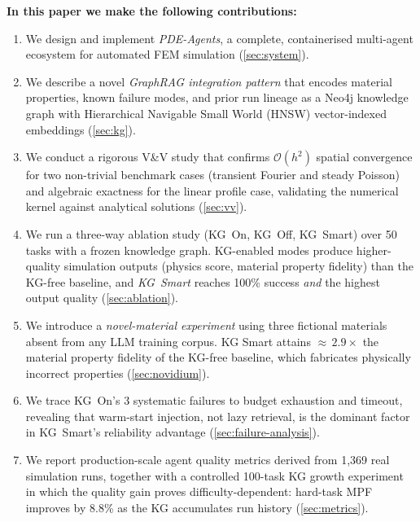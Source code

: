 \documentclass[twocolumn]{article}
\begin{document}
\textbf{In this paper we make the following contributions:}
\begin{enumerate}
  \item We design and implement \textit{PDE-Agents}, a complete, containerised
        multi-agent ecosystem for automated FEM simulation
        (\cref{sec:system}).
  \item We describe a novel \emph{GraphRAG integration pattern} that encodes
        material properties, known failure modes, and prior run lineage as a
        Neo4j knowledge graph with Hierarchical Navigable Small World
        (HNSW) vector-indexed embeddings \citep{malkov2020hnsw}
        (\cref{sec:kg}).
  \item We conduct a rigorous V\&V study that confirms $\mathcal{O}(h^2)$
        spatial convergence for two non-trivial benchmark cases
        (transient Fourier and steady Poisson) and algebraic exactness
        for the linear profile case, validating
        the numerical kernel against analytical solutions
        (\cref{sec:vv}).
  \item We run a three-way ablation study (KG~On, KG~Off, KG~Smart)
        over 50 tasks with a frozen knowledge graph.  KG-enabled modes
        produce higher-quality simulation outputs (physics score,
        material property fidelity) than the KG-free baseline, and
        \emph{KG~Smart} reaches 100\% success \emph{and} the highest
        output quality (\cref{sec:ablation}).
  \item We introduce a \emph{novel-material experiment} using three
        fictional materials absent from any LLM training corpus.
        KG Smart attains ${\approx}\,2.9\times$ the material property
        fidelity of the KG-free baseline, which fabricates physically
        incorrect properties (\cref{sec:novidium}).
  \item We trace KG~On's 3 systematic failures to budget exhaustion
        and timeout, revealing that warm-start injection, not lazy
        retrieval, is the dominant factor in KG~Smart's reliability
        advantage (\cref{sec:failure-analysis}).
  \item We report production-scale agent quality metrics derived from
        1{,}369 real simulation runs, together with a controlled
        100-task KG growth experiment in which the quality gain proves
        difficulty-dependent: hard-task MPF improves by 8.8\% as the KG
        accumulates run history (\cref{sec:metrics}).
\end{enumerate}
\end{document}

